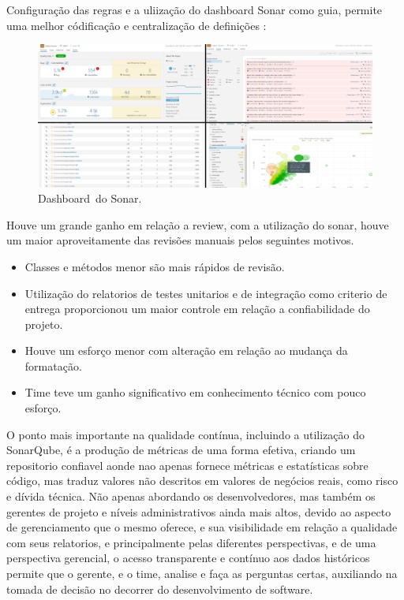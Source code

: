 \documentclass[12pt]{article}
\begin{document}
Configuração das regras e a uliização do dashboard Sonar como guia, permite uma melhor códificação e centralização de definições :

\begin{figure}[h]
	\centering
		\includegraphics[scale=0.25]{img/sonar-dashboard.png}
	\caption{Dashboard\ do Sonar.}
	\label{fig:sonar-dashboard}
\end{figure}

Houve um grande ganho em relação a review, com a utilização do sonar, houve um maior aproveitamente das revisões manuais pelos seguintes motivos.
 \begin{itemize}
	\item Classes e métodos menor são mais rápidos de revisão.
  \item Utilização do relatorios de testes unitarios e de integração como criterio de entrega proporcionou um maior controle em relação a confiabilidade do projeto.
	\item Houve um esforço menor com alteração em relação ao mudança da formatação.
	\item Time teve um ganho significativo em conhecimento técnico com pouco esforço.
\end{itemize}

O ponto mais importante na qualidade contínua, incluindo a utilização do SonarQube, é a produção de métricas de uma forma efetiva, criando um repositorio confiavel aonde nao apenas fornece métricas e estatísticas sobre código, mas traduz valores não descritos em valores de negócios reais, como risco e dívida técnica.
Não apenas abordando os desenvolvedores, mas também os gerentes de projeto e níveis administrativos ainda mais altos, devido ao aspecto de gerenciamento que o mesmo oferece, e sua visibilidade em relação a qualidade com seus relatorios, e principalmente pelas diferentes perspectivas, e de uma perspectiva gerencial, o acesso transparente e contínuo aos dados históricos permite que o gerente, e o time, analise e faça as perguntas certas,  auxiliando na tomada de decisão no decorrer do desenvolvimento de software.

\newpage
%


\end{document}
